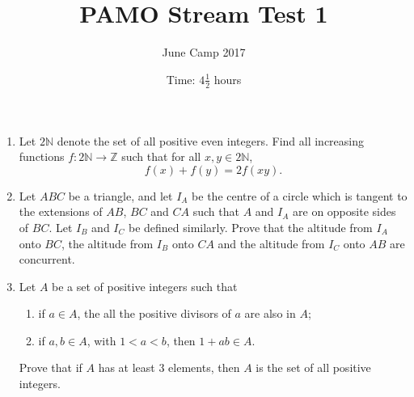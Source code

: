 \documentclass{article}
\title{PAMO Stream Test 1}
\author{June Camp 2017}
\date{Time: $4\frac{1}{2}$ hours}
\begin{document}
 \maketitle

\begin{enumerate}

\item %
	Let $2\mathbb{N}$ denote the set of all positive even integers. Find all increasing functions $f:2\mathbb{N}\to\mathbb{Z}$ such that for all $x,y \in 2\mathbb{N}$, \[f(x)+f(y) = 2f(xy).\]

\item %
	Let $ABC$ be a triangle, and let $I_A$ be the centre of a circle which is tangent to the extensions of $AB$, $BC$ and $CA$ such that $A$ and $I_A$ are on opposite sides of $BC$. Let $I_B$ and $I_C$ be defined similarly. Prove that the altitude from $I_A$ onto $BC$, the altitude from $I_B$ onto $CA$ and the altitude from $I_C$ onto $AB$ are concurrent.

\item %
	Let $A$ be a set of positive integers such that
	\begin{enumerate}
	\item if $a\in A$, the all the positive divisors of $a$ are also in $A$;
	\item if $a,b\in A$, with $1<a<b$, then $1+ab \in A$.
	\end{enumerate}
	Prove that if $A$ has at least 3 elements, then $A$ is the set of all positive integers.

\end{enumerate}
\end{document}
